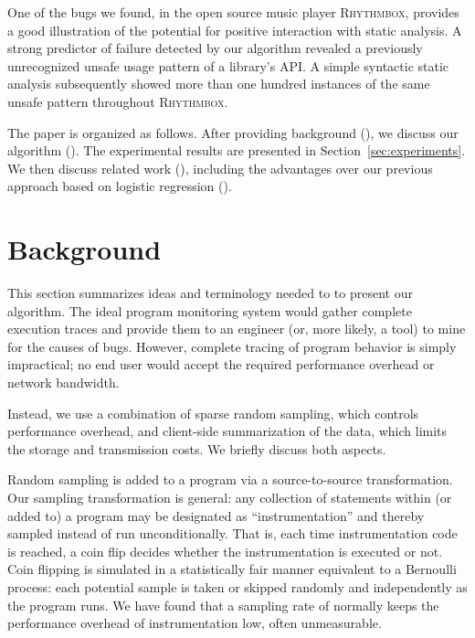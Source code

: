 \documentclass[draft]{sig-alternate}
\newcommand{\rhythmbox}{\textsc{Rhythmbox}\xspace}
\begin{document}
One of the bugs we found, in the open source music player \rhythmbox,
provides a good illustration of the potential for positive interaction
with static analysis.  A strong predictor of failure detected by our
algorithm revealed a previously unrecognized unsafe usage pattern of a
library's API.  A simple syntactic static analysis subsequently showed
more than one hundred instances of the same unsafe pattern throughout
\rhythmbox.

The paper is organized as follows.  After providing background
(), we discuss our algorithm
(). The experimental results are presented in
Section~\ref{sec:experiments}.  We then discuss related
work (), including the advantages over our
previous approach based on logistic regression
().


\section{Background}
\label{sec:background}

This section summarizes ideas and terminology needed to to present our
algorithm.  The ideal program monitoring system would gather complete
execution traces and provide them to an engineer (or, more likely, a
tool) to mine for the causes of bugs.  However, complete tracing of
program behavior is simply impractical; no end user would accept the
required performance overhead or network bandwidth.

Instead, we use a combination of sparse random sampling, which controls
performance overhead, and client-side summarization of the data, which
limits the storage and transmission costs.  We briefly discuss
both aspects.

Random sampling is added to a program via a source-to-source transformation.
Our sampling transformation is general: any collection of
statements within (or added to) a program may be designated as
``instrumentation'' and thereby sampled instead of run
unconditionally.  That is, each time instrumentation code is reached,
a coin flip decides whether the instrumentation is executed or not.
Coin flipping is simulated in a statistically fair
manner equivalent to a Bernoulli process: each potential sample is
taken or skipped randomly and independently as the program runs.
We have found that a sampling rate of  normally keeps the performance overhead
of instrumentation low, often unmeasurable.
\end{document}
